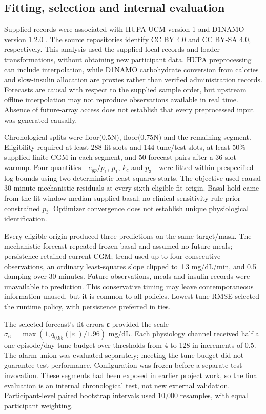 \documentclass[journal,10pt,letterpaper]{IEEEtran}
\begin{document}
\subsection{Fitting, selection and internal evaluation}

Supplied records were associated with HUPA-UCM version 1 and D1NAMO
version 1.2.0 \cite{R14,R15}. The source repositories identify CC BY 4.0
and CC BY-SA 4.0, respectively. This analysis used the supplied local
records and loader transformations, without obtaining new participant
data. HUPA preprocessing can include interpolation, while D1NAMO
carbohydrate conversion from calories and slow-insulin allocation are
proxies rather than verified administration records. Forecasts are
causal with respect to the supplied sample order, but upstream offline
interpolation may not reproduce observations available in real time.
Absence of future-array access does not establish that every
preprocessed input was generated causally.

Chronological splits were floor(0.5N), floor(0.75N) and the remaining
segment. Eligibility required at least 288 fit slots and 144 tune/test
slots, at least 50\% supplied finite CGM in each segment, and 50
forecast pairs after a 36-slot warmup. Four
quantities---\(e_{gp}\)/\(p_1\), \(p_1\), \(k_c\) and \(p_3\)---were
fitted within prespecified log bounds using two deterministic
least-squares starts. The objective used causal 30-minute mechanistic
residuals at every sixth eligible fit origin. Basal hold came from the
fit-window median supplied basal; no clinical sensitivity-rule prior
constrained \(p_3\). Optimizer convergence does not establish unique
physiological identification.

Every eligible origin produced three predictions on the same
target/mask. The mechanistic forecast repeated frozen basal and assumed
no future meals; persistence retained current CGM; trend used up to four
consecutive observations, an ordinary least-squares slope clipped to ±3
mg/dL/min, and 0.5 damping over 30 minutes. Future observations, meals
and insulin records were unavailable to prediction. This conservative
timing may leave contemporaneous information unused, but it is common to
all policies. Lowest tune RMSE selected the runtime policy, with
persistence preferred in ties.

The selected forecast's fit errors ε provided the scale
\(\sigma_6=\max(1,q_{0.95}(|\varepsilon|)/1.96)\) mg/dL. Each physiology
channel received half a one-episode/day tune budget over thresholds from
4 to 128 in increments of 0.5. The alarm union was evaluated separately;
meeting the tune budget did not guarantee test performance.
Configuration was frozen before a separate test invocation. These
segments had been exposed in earlier project work, so the final
evaluation is an internal chronological test, not new external
validation. Participant-level paired bootstrap intervals used 10,000
resamples, with equal participant weighting.
\end{document}
